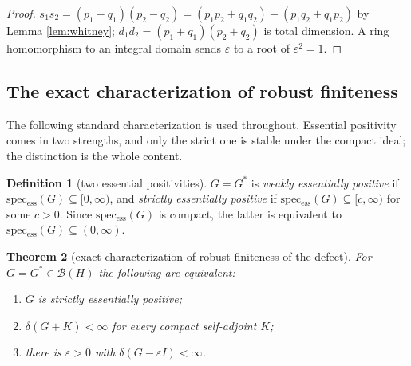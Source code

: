 \documentclass[11pt,reqno]{amsart}
\newtheorem{theorem}{Theorem}[section]
\theoremstyle{definition}
\newtheorem{definition}[theorem]{Definition}
\newcommand{\specess}{\operatorname{spec_{ess}}}
\begin{document}
\begin{proof}
\(s_1s_2=(p_1-q_1)(p_2-q_2)=(p_1p_2+q_1q_2)-(p_1q_2+q_1p_2)\) by Lemma
\ref{lem:whitney}; \(d_1d_2=(p_1+q_1)(p_2+q_2)\) is total dimension. A ring
homomorphism to an integral domain sends \(\varepsilon\) to a root of
\(\varepsilon^2=1\).
\end{proof}

\subsection{The exact characterization of robust finiteness}
The following standard characterization is used throughout. Essential positivity comes in two
strengths, and only the strict one is stable under the compact ideal; the
distinction is the whole content.

\begin{definition}[two essential positivities]\label{def:two-pos}
\(G=G^*\) is \emph{weakly essentially positive} if
\(\specess(G)\subseteq[0,\infty)\), and \emph{strictly essentially positive} if
\(\specess(G)\subseteq[c,\infty)\) for some \(c>0\). Since \(\specess(G)\) is
compact, the latter is equivalent to \(\specess(G)\subseteq(0,\infty)\).
\end{definition}

\begin{theorem}[exact characterization of robust finiteness of the defect]
\label{thm:exact}
For \(G=G^*\in\mathcal B(H)\) the following are equivalent:
\begin{enumerate}
\item[\textup{(i)}] \(G\) is strictly essentially positive;
\item[\textup{(ii)}] \(\delta(G+K)<\infty\) for \emph{every} compact
self-adjoint \(K\);
\item[\textup{(iii)}] there is \(\varepsilon>0\) with
\(\delta(G-\varepsilon I)<\infty\).
\end{enumerate}
\end{theorem}
\end{document}
